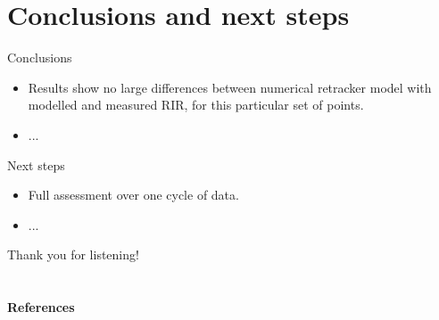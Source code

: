 \documentclass[compress,8pt]{beamer}
\begin{document}
\section{Conclusions and next steps}
 \begin{frame}{Conclusions}
 
\begin{itemize}
\item Results show no large differences between numerical retracker model with modelled and measured RIR, for this particular set of points.
\item ...
\end{itemize}

\end{frame}
%



\begin{frame}{Next steps}
\begin{itemize}

\item Full assessment over one cycle of data.

\item ...
\end{itemize}

\end{frame}
%



{
\begin{frame}[plain]
 
 \begin{center}
 \Large Thank you for listening!
  \end{center}
  
\end{frame}
}



\section*{}
\begin{frame}


\textbf{References}

\bigskip

\tiny

 
\end{frame}
\end{document}
